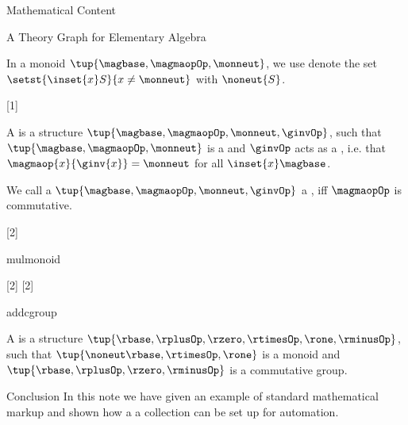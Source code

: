 \documentclass{omdoc}
\begin{document}
\begin{omgroup}[id=sec.math]{Mathematical Content}
\begin{omgroup}[id=sec.math]{A Theory Graph for Elementary Algebra}
\begin{module}[name=monoid]
 \begin{definition}[id=noneut.def]
   In a monoid $\tup{\magbase,\magmaopOp,\monneut}$, we use denote the set
   $\setst{\inset{x}S}{x\ne\monneut}$ with $\noneut{S}$.
 \end{definition}
\end{module}

\begin{module}[name=group]
  [1]{\prefix{}}
  \begin{definition}[id=group.def]
    A  is a structure $\tup{\magbase,\magmaopOp,\monneut,\ginvOp}$, such that
    $\tup{\magbase,\magmaopOp,\monneut}$ is a  and $\ginvOp$ acts as
    a , i.e. that $\magmaop{x}{\ginv{x}}=\monneut$ for all
    $\inset{x}\magbase$.
  \end{definition}
\end{module}

\begin{module}[name=cgroup]
\begin{definition}[id=cgroup.def]
  We call a  $\tup{\magbase,\magmaopOp,\monneut,\ginvOp}$ a
  , iff $\magmaopOp$ is commutative.
\end{definition}
\end{module}

\begin{module}[name=ring]
[2]{\infix{}}
\begin{sstructure}{mul}{monoid}
\end{sstructure}
[2]{\infix{}}
[2]{\infix{}}
\begin{sstructure}{add}{cgroup}
\end{sstructure}

\begin{definition}
  A  is a structure $\tup{\rbase,\rplusOp,\rzero,\rtimesOp,\rone,\rminusOp}$,
  such that $\tup{\noneut\rbase,\rtimesOp,\rone}$ is a monoid and
  $\tup{\rbase,\rplusOp,\rzero,\rminusOp}$ is a commutative group.
\end{definition}
\end{module}
\end{omgroup}
\end{omgroup}

\begin{omgroup}[id=concl]{Conclusion}
  In this note we have given an example of standard mathematical markup and shown how a a
  {\sTeX} collection can be set up for automation.
\end{omgroup}
\printbibliography
\end{document}
